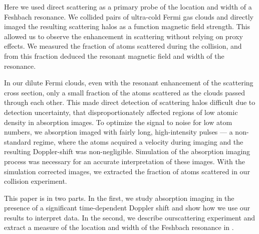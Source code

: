 \documentclass[12pt]{iopart}
\begin{document}
\par Here we used direct scattering as a primary probe of the location and width of a Feshbach resonance. We collided pairs of ultra-cold Fermi gas clouds and directly imaged the resulting \swave scattering halos as a function magnetic field strength. This allowed us to observe the enhancement in scattering without relying on proxy effects. We measured the fraction of atoms scattered during the collision, and from this fraction deduced the resonant magnetic field  and width of the resonance. 
\par In our dilute Fermi clouds, even with the resonant enhancement of the scattering cross section, only a small fraction of the atoms scattered as the clouds passed through each other. This made direct detection of \swave scattering halos difficult due to detection uncertainty, that disproportionately affected regions of low atomic density in absorption images. To optimize the signal to noise for low atom numbers, we absorption imaged with fairly long, high-intensity pulses --- a non-standard regime, where the atoms acquired a velocity during imaging and the resulting Doppler-shift was non-negligible.  Simulation of the absorption imaging process was necessary for an accurate interpretation of these images. With the simulation corrected images, we extracted the fraction of atoms scattered in our collision experiment.
\par This paper is in two parts. In the first, we study absorption imaging in the presence of a significant time-dependent Doppler shift and show how we use our results to interpret data. In the second, we describe our\swave scattering experiment and extract a measure of the location and width of the Feshbach resonance in \K{}. 
\end{document}
